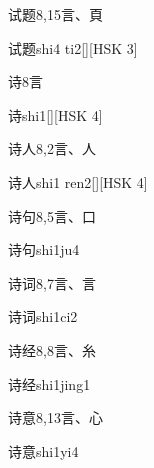 \begin{Entry}{试题}{8,15}{⾔、⾴}
  \begin{Phonetics}{试题}{shi4 ti2}[][HSK 3]
  \end{Phonetics}
\end{Entry}

\begin{Entry}{诗}{8}{⾔}
  \begin{Phonetics}{诗}{shi1}[][HSK 4]
  \end{Phonetics}
\end{Entry}

\begin{Entry}{诗人}{8,2}{⾔、⼈}
  \begin{Phonetics}{诗人}{shi1 ren2}[][HSK 4]
  \end{Phonetics}
\end{Entry}

\begin{Entry}{诗句}{8,5}{⾔、⼝}
  \begin{Phonetics}{诗句}{shi1ju4}
  \end{Phonetics}
\end{Entry}

\begin{Entry}{诗词}{8,7}{⾔、⾔}
  \begin{Phonetics}{诗词}{shi1ci2}
  \end{Phonetics}
\end{Entry}

\begin{Entry}{诗经}{8,8}{⾔、⽷}
  \begin{Phonetics}{诗经}{shi1jing1}
  \end{Phonetics}
\end{Entry}

\begin{Entry}{诗意}{8,13}{⾔、⼼}
  \begin{Phonetics}{诗意}{shi1yi4}
  \end{Phonetics}
\end{Entry}

